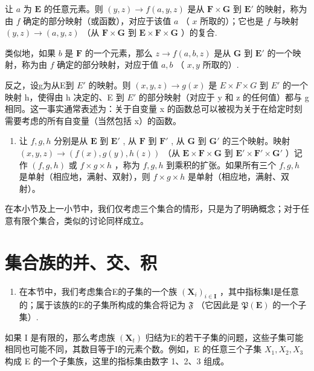 让 \(a\) 为 \(\mathbf{E}\) 的任意元素。则 \((y, z) \to f(a, y, z)\) 是从 \(\mathbf{F} \times \mathbf{G}\) 到 \(\mathbf{E}'\) 的映射，称为由 \(f\) 确定的部分映射（或函数），对应于该值 \(a\) （ \(x\) 所取的）；它也是 \(f\) 与映射 \((y, z) \to (a, y, z)\) （从 \(\mathbf{F} \times \mathbf{G}\) 到 \(\mathbf{E} \times \mathbf{F} \times \mathbf{G}\) ）的复合.

类似地，如果 \(b\) 是 \(\mathbf{F}\) 的一个元素，那么 \(z \to f(a, b, z)\) 是从 \(\mathbf{G}\) 到 \(\mathbf{E}'\) 的一个映射，称为由 \(f\) 确定的部分映射，对应于值 \(a, b\) （ \(x, y\) 所取的）.

反之，设g为从E到 \(E'\) 的映射。则 \((x, y, z) \to g(x)\) 是 \(E \times F \times G\) 到 \(E'\) 的一个映射 h，使得由 h 决定的、E 到 \(E'\) 的部分映射（对应于 y 和 z 的任何值）都与 g 相同。这一事实通常表述为：关于自变量 x 的函数总可以被视为关于在给定时刻需要考虑的所有自变量（当然包括 x）的函数。

\begin{enumerate}
\def\labelenumi{\arabic{enumi}.}
\setcounter{enumi}{13}
\tightlist
\item
  让 \(f, g, h\) 分别是从 \(\mathbf{E}\) 到 \(\mathbf{E}'\) , 从 \(\mathbf{F}\) 到 \(\mathbf{F}'\) , 从 \(\mathbf{G}\) 到 \(\mathbf{G}'\) 的三个映射。映射 \((x, y, z) \to (f(x), g(y), h(z))\) （从 \(\mathbf{E} \times \mathbf{F} \times \mathbf{G}\) 到 \(\mathbf{E}' \times \mathbf{F}' \times \mathbf{G}'\) ）记作 \((f, g, h)\) 或 \(f \times g \times h\) ，称为 \(f, g, h\) 到乘积的扩张。如果所有三个 \(f, g, h\) 是单射（相应地，满射、双射），则 \(f \times g \times h\) 是单射（相应地，满射、双射）。
\end{enumerate}

在本小节及上一小节中，我们仅考虑三个集合的情形，只是为了明确概念；对于任意有限个集合，类似的讨论同样成立。

\section{集合族的并、交、积}

\begin{enumerate}
\def\labelenumi{\arabic{enumi}.}
\tightlist
\item
  在本节中，我们考虑集合E的子集的一个族 \((\mathbf{X}_{i})_{i\in\mathbf{I}}\) ，其中指标集I是任意的；属于该族的E的子集所构成的集合将记为 \(\mathfrak{F}\) （它因此是 \(\mathfrak{P}(\mathbf{E})\) 的一个子集）.
\end{enumerate}

如果 I 是有限的，那么考虑族 \((\mathbf{X}_{t})\) 归结为E的若干子集的问题，这些子集可能相同也可能不同，其数目等于I的元素个数。例如，E 的任意三个子集 \(X_{1}, X_{2}, X_{3}\) 构成 E 的一个子集族，这里的指标集由数字 1、2、3 组成。

